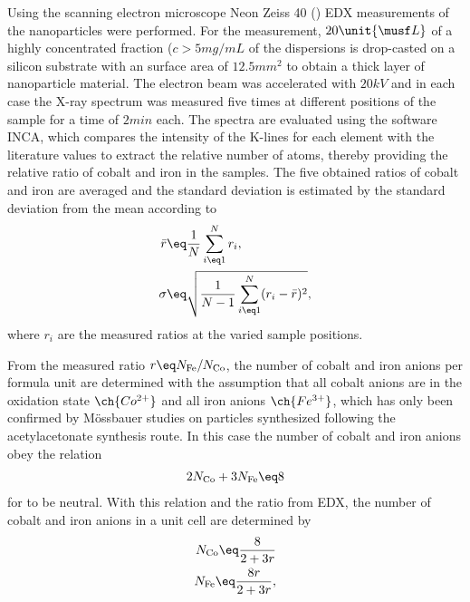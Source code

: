 \documentclass[\main/dresen_thesis.tex]{subfiles}
\begin{document}
    Using the scanning electron microscope Neon Zeiss 40 () EDX measurements of the nanoparticles were performed.
    For the measurement, $20 \unit{\musf L}$ of a highly concentrated fraction ($c > 5 \unit{mg/mL}$ of the dispersions is drop-casted on a silicon substrate with an surface area of $12.5 \unit{mm^2}$ to obtain a thick layer of nanoparticle material.
    The electron beam was accelerated with $20 \unit{kV}$ and in each case the X-ray spectrum was measured five times at different positions of the sample for a time of $2 \unit{min}$ each.
    The spectra are evaluated using the software INCA, which compares the intensity of the K-lines for each element with the literature values to extract the relative number of atoms, thereby providing the relative ratio of cobalt and iron in the samples.
    The five obtained ratios of cobalt and iron are averaged and the standard deviation is estimated by the standard deviation from the mean according to
    \begin{align}
      \bar{r} &\eq \frac{1}{N} \sum_{i \eq 1}^N r_i,\\
      \sigma &\eq \sqrt{\frac{1}{N-1} \sum_{i \eq 1}^N (r_i - \bar{r})^2},
    \end{align}
    where $r_i$ are the measured ratios at the varied sample positions.

    From the measured ratio $r \eq N_\mathrm{Fe} / N_\mathrm{Co}$, the number of cobalt and iron anions per formula unit are determined with the assumption that all cobalt anions are in the oxidation state $\ch{Co^{2+}}$ and all iron anions $\ch{Fe^{3+}}$, which has only been confirmed by M\"ossbauer studies on particles synthesized following the acetylacetonate synthesis route.
    In this case the number of cobalt and iron anions obey the relation
    \begin{align}
      2 N_\mathrm{Co} + 3 N_\mathrm{Fe} \eq 8
    \end{align}
    for  to be neutral.
    With this relation and the ratio from EDX, the number of cobalt and iron anions in a unit cell are determined by
    \begin{align}
      N_\mathrm{Co} \eq \frac{8}{2 + 3r}\\
      N_\mathrm{Fe} \eq \frac{8r}{2 + 3r},
    \end{align}
\end{document}
